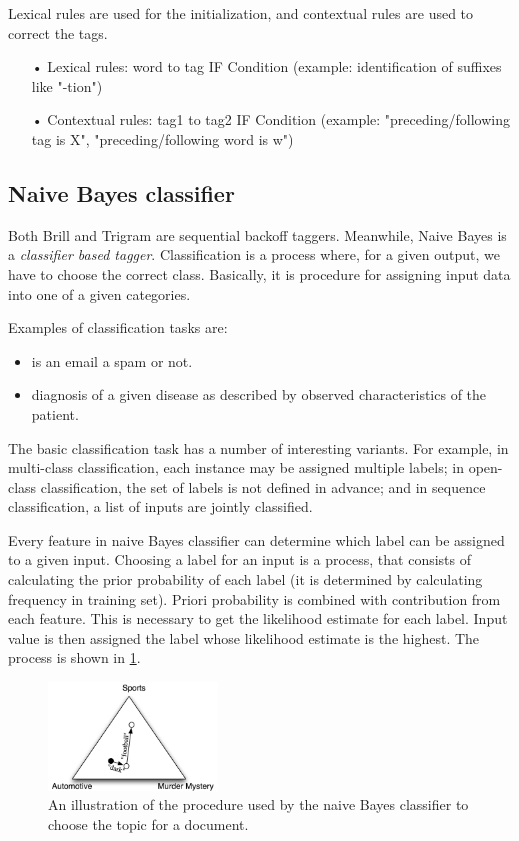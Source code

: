 \documentclass[10pt, conference, compsocconf]{IEEEtran}
\begin{document}
Lexical rules are used for the initialization, and contextual rules are used to correct the tags.
\begin{itemize}
\item[•] Lexical rules: word to tag IF Condition (example: identification of suffixes like "-tion")
\item[•] Contextual rules: tag1 to tag2 IF Condition (example: "preceding/following tag is X", "preceding/following word is w")       
\end{itemize}
\subsection{Naive Bayes classifier}
Both Brill and Trigram are sequential backoff taggers. Meanwhile, Naive Bayes is a \textit{classifier based tagger}.
Classification is a process where, for a given output, we have to choose the correct class. Basically, it is  procedure for assigning input data into one of a given categories.

Examples of classification tasks are:
\begin{itemize}
\item is an email a spam or not.
\item diagnosis of a given disease as described by observed characteristics of the patient.
\end{itemize}
The basic classification task has a number of interesting variants. For example, in multi-class classification, each instance may be assigned multiple labels; in open-class classification, the set of labels is not defined in advance; and in sequence classification, a list of inputs are jointly classified.

Every feature in naive Bayes classifier can determine which label can be assigned to a given input. Choosing a label for an input is a process, that consists of calculating the prior probability of each label (it is determined by calculating frequency in training set). Priori probability is combined with contribution from each feature. This is necessary to get the likelihood estimate for each label. Input value is then assigned the label whose likelihood estimate is the highest. The process is shown in \ref{fig:naive-bayes-triangle}.

\begin{figure}[htb]
\begin{center}
\includegraphics[width=0.4\textwidth]{naive-bayes-triangle.png} 
\end{center}
\caption{An illustration of the procedure used by the naive Bayes classifier to choose the topic for a document.}
\label{fig:naive-bayes-triangle}
\end{figure}
\end{document}
